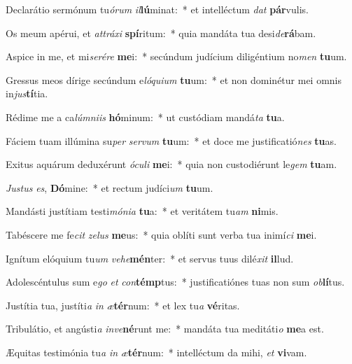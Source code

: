 \item Declarátio sermónum tu\textit{ó}\textit{rum} \textit{il}\textbf{lú}minat:~* et intelléctum \textit{dat} \textbf{pár}vulis.
\item Os meum apérui, et \textit{at}\textit{trá}\textit{xi} \textbf{spí}ritum:~* quia mandáta tua desi\textit{de}\textbf{rá}bam.
\item Aspice in me, et mi\textit{se}\textit{ré}\textit{re} \textbf{me}i:~* secúndum judícium diligéntium no\textit{men} \textbf{tu}um.
\item Gressus meos dírige secúndum e\textit{ló}\textit{qui}\textit{um} \textbf{tu}um:~* et non dominétur mei omnis in\textit{jus}\textbf{tí}tia.
\item Rédime me a ca\textit{lúm}\textit{ni}\textit{is} \textbf{hó}minum:~* ut custódiam mandá\textit{ta} \textbf{tu}a.
\item Fáciem tuam illúmina su\textit{per} \textit{ser}\textit{vum} \textbf{tu}um:~* et doce me justificatió\textit{nes} \textbf{tu}as.
\item Exitus aquárum deduxérunt \textit{ó}\textit{cu}\textit{li} \textbf{me}i:~* quia non custodiérunt le\textit{gem} \textbf{tu}am.
\item \textit{Jus}\textit{tus} \textit{es}, \textbf{Dó}mine:~* et rectum judíci\textit{um} \textbf{tu}um.
\item Mandásti justítiam testi\textit{mó}\textit{ni}\textit{a} \textbf{tu}a:~* et veritátem tu\textit{am} \textbf{ni}mis.
\item Tabéscere me fe\textit{cit} \textit{ze}\textit{lus} \textbf{me}us:~* quia oblíti sunt verba tua inimí\textit{ci} \textbf{me}i.
\item Ignítum elóquium tu\textit{um} \textit{ve}\textit{he}\textbf{mén}ter:~* et servus tuus dilé\textit{xit} \textbf{il}lud.
\item Adolescéntulus sum e\textit{go} \textit{et} \textit{con}\textbf{témp}tus:~* justificatiónes tuas non sum \textit{ob}\textbf{lí}tus.
\item Justítia tua, justíti\textit{a} \textit{in} \textit{æ}\textbf{tér}num:~* et lex tu\textit{a} \textbf{vé}ritas.
\item Tribulátio, et angústi\textit{a} \textit{in}\textit{ve}\textbf{né}runt me:~* mandáta tua meditáti\textit{o} \textbf{me}a est.
\item Æquitas testimónia tu\textit{a} \textit{in} \textit{æ}\textbf{tér}num:~* intelléctum da mihi, \textit{et} \textbf{vi}vam.
